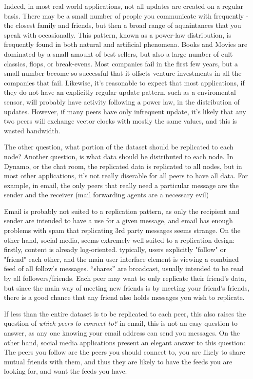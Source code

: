 \documentclass[sigconf]{acmart}
\begin{document}
Indeed, in most real world applications, not all updates are created
on a regular basis. There may be a small number of people you
communicate with frequently - the closest family and friends, but then
a broad range of aquaintances that you speak with occasionally. This
pattern, known as a power-law distribution, is frequently found in
both natural and artificial phenomena.  Books and Movies are dominated
by a small amount of best sellers, but also a large number of cult
classics, flops, or break-evens.  Most companies fail in the first few
years, but a small number become so successful that it offsets venture
investments in all the companies that fail. Likewise, it's reasonable
to expect that most applications, if they do not have an explicitly
regular update pattern, such as a enviromental sensor, will probably
have activity following a power law, in the distribution of
updates. However, if many peers have only infrequent update, it's
likely that any two peers will exchange vector clocks with mostly the
same values, and this is wasted bandwidth.

The other question, what portion of the dataset should be replicated
to each node? Another question, is what data should be distributed to
each node.  In Dynamo, or the chat room, the replicated data is
replicated to all nodes, but in most other applications, it's not
really diserable for all peers to have all data. For example, in
email, the only peers that really need a particular message are the
sender and the receiver (mail forwarding agents are a necessary evil)

Email is probably not suited to a replication pattern, as only the
recipient and sender are intended to have a use for a given message,
and email has enough problems with spam that replicating 3rd party
messages seems strange. On the other hand, social media, seems
extremely well-suited to a replication design: firstly, content is
already log-oriented. typically, users explicitly "follow" or "friend"
each other, and the main user interface element is viewing a combined
feed of all follow's messages. ``shares'' are broadcast, usually
intended to be read by all followers/friends.  Each peer may want to
only replicate their friend's data, but since the main way of meeting
new friends is by meeting your friend's friends, there is a good
chance that any friend also holds messages you wish to replicate.

If less than the entire dataset is to be replicated to each peer, this
also raises the question of {\em which peers to connect to?}  in
email, this is not an easy question to answer, as any one knowing your
email address can send you messages. On the other hand, social media
applications present an elegant answer to this question: The peers you
follow are the peers you should connect to, you are likely to share
mutual friends with them, and thus they are likely to have the feeds
you are looking for, and want the feeds you have.
\end{document}
